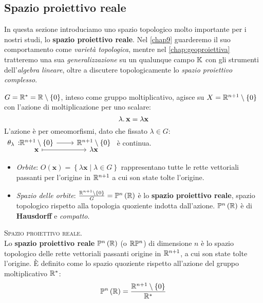 \subsection{Spazio proiettivo reale}
In questa sezione introduciamo uno spazio topologico molto importante per i nostri studi, lo \textbf{spazio proiettivo reale}. Nel \autoref{chap9} guarderemo il suo comportamento come \textit{varietà topologica}, mentre nel \autoref{chap:geoproiettiva} tratteremo una sua \textit{generalizzazione} su un qualunque campo $\mathbb{K}$ con gli strumenti dell'\textit{algebra lineare}, oltre a discutere topologicamente lo \textit{spazio proiettivo complesso}.
\begin{example}
	$G=\mathbb{R}^{\ast}=\mathbb{R}\setminus\left\{0\right\}$, inteso come gruppo moltiplicativo, agisce su $X=\mathbb{R}^{n+1}\setminus\left\{0\right\}$ con l'azione di moltiplicazione per uno scalare:
	\begin{equation}
		\lambda\ldotp \mathbf{x} = \lambda\mathbf{x}
	\end{equation}
L'azione è per omeomorfismi, dato che fissato $\lambda\in G$: $\funztot{\theta_\lambda}{\realset^{n+1}\setminus\left\{0\right\}}{\realset^{n+1}\setminus\left\{0\right\}}{\mathbf{x}}{\lambda \mathbf{x}}$ è continua.
\begin{itemize}
	\item \textit{Orbite}: $O\left(\mathbf{x}\right)=\left\{\lambda \mathbf{x}\mid \lambda\in G\right\}$ rappresentano tutte le rette vettoriali passanti per l'origine in $\mathbb{R}^{n+1}$ a cui son state tolte l'origine.
	\item \textit{Spazio delle orbite}: $\frac{\realset^{n+1}\setminus\left\{0\right\}}{G}=\proj[n]{\realset}$ è lo \textbf{spazio proiettivo reale}, spazio topologico rispetto alla topologia quoziente indotta dall'azione. $\proj[n]{\realset}$ è di \textbf{Hausdorff} e \textit{compatto}.
\end{itemize}
\vspace{-3mm}
\end{example}
\begin{define}\textsc{Spazio proiettivo reale.}\\
	Lo \textbf{spazio proiettivo reale} $\proj[n]{\realset}$ (o $\realset\proj[n]{\ }$) di dimensione $n$ è lo spazio topologico delle rette vettoriali passanti origine in $\mathbb{R}^{n+1}$, a cui son state tolte l'origine. È definito come lo spazio quoziente rispetto all'azione del gruppo moltiplicativo $\mathbb{R}^{\ast}$:
	\begin{equation}
		\proj[n]{\realset}= \frac{\realset^{n+1}\setminus \left\{0\right\}}{\realset^{\ast}}
	\end{equation}
\vspace{-6mm}
\end{define}
